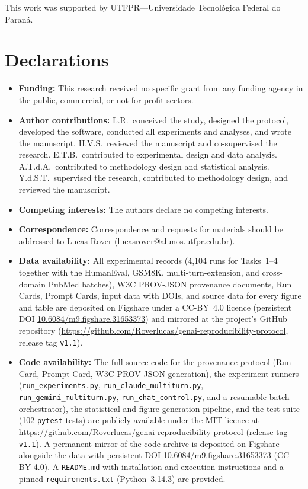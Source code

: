 \documentclass[sn-nature]{sn-jnl}
\begin{document}

This work was supported by UTFPR---Universidade Tecnol\'ogica Federal do Paran\'a.

\section*{Declarations}

\begin{itemize}
\item \textbf{Funding:}
This research received no specific grant from any funding agency in the public, commercial, or not-for-profit sectors.

\item \textbf{Author contributions:}
L.R.\ conceived the study, designed the protocol, developed the software, conducted all experiments and analyses, and wrote the manuscript.
H.V.S.\ reviewed the manuscript and co-supervised the research.
E.T.B.\ contributed to experimental design and data analysis.
A.T.d.A.\ contributed to methodology design and statistical analysis.
Y.d.S.T.\ supervised the research, contributed to methodology design, and reviewed the manuscript.

\item \textbf{Competing interests:}
The authors declare no competing interests.

\item \textbf{Correspondence:}
Correspondence and requests for materials should be addressed to Lucas Rover (lucasrover@alunos.utfpr.edu.br).

\item \textbf{Data availability:}
All experimental records (4{,}104 runs for Tasks~1--4 together with the HumanEval, GSM8K, multi-turn-extension, and cross-domain PubMed batches), W3C PROV-JSON provenance documents, Run Cards, Prompt Cards, input data with DOIs, and source data for every figure and table are deposited on Figshare under a CC-BY~4.0 licence (persistent DOI \href{https://doi.org/10.6084/m9.figshare.31653373}{10.6084/m9.figshare.31653373}) and mirrored at the project's GitHub repository (\url{https://github.com/Roverlucas/genai-reproducibility-protocol}, release tag \texttt{v1.1}).

\item \textbf{Code availability:}
The full source code for the provenance protocol (Run Card, Prompt Card, W3C PROV-JSON generation), the experiment runners (\texttt{run\_experiments.py}, \texttt{run\_claude\_multiturn.py}, \texttt{run\_gemini\_multiturn.py}, \texttt{run\_chat\_control.py}, and a resumable batch orchestrator), the statistical and figure-generation pipeline, and the test suite (102 \texttt{pytest} tests) are publicly available under the MIT licence at \url{https://github.com/Roverlucas/genai-reproducibility-protocol} (release tag \texttt{v1.1}). A permanent mirror of the code archive is deposited on Figshare alongside the data with persistent DOI \href{https://doi.org/10.6084/m9.figshare.31653373}{10.6084/m9.figshare.31653373} (CC-BY 4.0). A \texttt{README.md} with installation and execution instructions and a pinned \texttt{requirements.txt} (Python~3.14.3) are provided.
\end{itemize}
\end{document}
